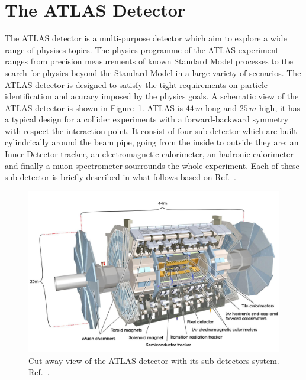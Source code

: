 \section{The ATLAS Detector}\label{sec:atlas}
The ATLAS detector is a multi-purpose detector which aim to explore a wide range of physiscs topics. The physics programme of the ATLAS experiment ranges from 
precision measurements of known Standard Model processes to the search for physics beyond the Standard Model in a large variety of scenarios.
The ATLAS detector is designed to satisfy the tight requirements on particle identification and acuracy imposed by the physics goals.
A schematic view of the ATLAS detector is shown in Figure~\ref{fig:atlas}. ATLAS is $44\,m$ long and $25\,m$ high, it has a typical design for a collider 
experiments with a forward-backward symmetry with respect the interaction point. It consist of four sub-detector which are built cylindrically around the
beam pipe, going from the inside to outside they are: an Inner Detector tracker, an electromagnetic calorimeter, an hadronic calorimeter and finally
a muon spectrometer sourrounds the whole experiment. Each of these sub-detector is briefly described in what follows based on  Ref.~\cite{ATLASDetector}.


\begin{figure}[tp]
     \begin{center}

            \includegraphics[width=\textwidth]{figure/ATLAS.jpeg}

    \end{center}
    \caption{Cut-away view of the ATLAS detector with its sub-detectors system.  Ref.~\cite{ATLASDetector}.}



   \label{fig:atlas}
\end{figure}


